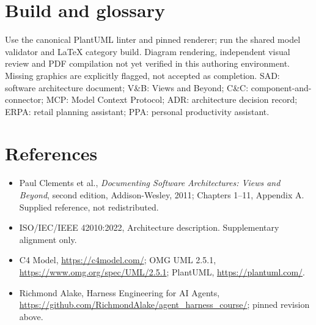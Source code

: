 \documentclass[10pt,letterpaper]{article}
\begin{document}
\section{Build and glossary}
Use the canonical PlantUML linter and pinned renderer; run the shared model validator and LaTeX category build. Diagram rendering, independent visual review and PDF compilation not yet verified in this authoring environment. Missing graphics are explicitly flagged, not accepted as completion. SAD: software architecture document; V\&B: Views and Beyond; C\&C: component-and-connector; MCP: Model Context Protocol; ADR: architecture decision record; ERPA: retail planning assistant; PPA: personal productivity assistant.
\section{References}
\begin{itemize}
\item Paul Clements et al., \emph{Documenting Software Architectures: Views and Beyond}, second edition, Addison-Wesley, 2011; Chapters 1--11, Appendix A. Supplied reference, not redistributed.
\item ISO/IEC/IEEE 42010:2022, Architecture description. Supplementary alignment only.
\item C4 Model, \url{https://c4model.com/}; OMG UML 2.5.1, \url{https://www.omg.org/spec/UML/2.5.1}; PlantUML, \url{https://plantuml.com/}.
\item Richmond Alake, Harness Engineering for AI Agents, \url{https://github.com/RichmondAlake/agent_harness_course/}; pinned revision above.
\end{itemize}
\end{document}
